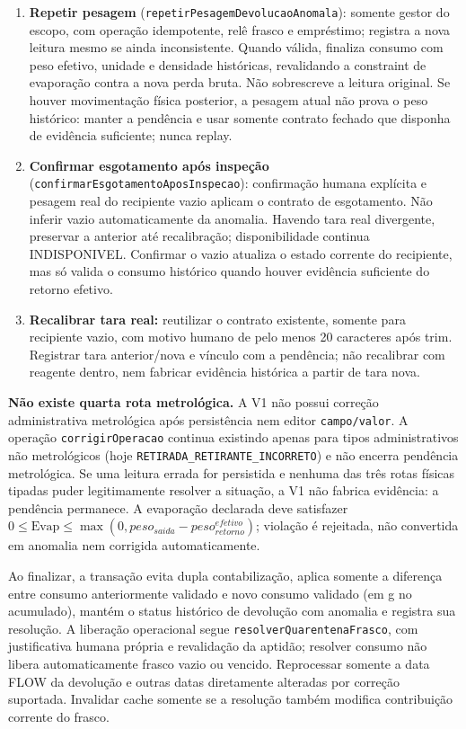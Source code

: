 \begin{enumerate}
\item \textbf{Repetir pesagem} (\nolinkurl{repetirPesagemDevolucaoAnomala}): somente gestor do escopo, com operação idempotente, relê frasco e empréstimo; registra a nova leitura mesmo se ainda inconsistente. Quando válida, finaliza consumo com peso efetivo, unidade e densidade históricas, revalidando a constraint de evaporação contra a nova perda bruta. Não sobrescreve a leitura original. Se houver movimentação física posterior, a pesagem atual não prova o peso histórico: manter a pendência e usar somente contrato fechado que disponha de evidência suficiente; nunca replay.
\item \textbf{Confirmar esgotamento após inspeção} (\nolinkurl{confirmarEsgotamentoAposInspecao}): confirmação humana explícita e pesagem real do recipiente vazio aplicam o contrato de esgotamento. Não inferir vazio automaticamente da anomalia. Havendo tara real divergente, preservar a anterior até recalibração; disponibilidade continua INDISPONIVEL. Confirmar o vazio atualiza o estado corrente do recipiente, mas só valida o consumo histórico quando houver evidência suficiente do retorno efetivo.
\item \textbf{Recalibrar tara real:} reutilizar o contrato existente, somente para recipiente vazio, com motivo humano de pelo menos 20 caracteres após trim. Registrar tara anterior/nova e vínculo com a pendência; não recalibrar com reagente dentro, nem fabricar evidência histórica a partir de tara nova.
\end{enumerate}
\textbf{Não existe quarta rota metrológica.} A V1 não possui correção administrativa metrológica após persistência nem editor \texttt{campo/valor}. A operação \nolinkurl{corrigirOperacao} continua existindo apenas para tipos administrativos não metrológicos (hoje \texttt{RETIRADA\_RETIRANTE\_INCORRETO}) e não encerra pendência metrológica. Se uma leitura errada for persistida e nenhuma das três rotas físicas tipadas puder legitimamente resolver a situação, a V1 não fabrica evidência: a pendência permanece. A evaporação declarada deve satisfazer $0 \le \text{Evap} \le \max(0, peso_{saida} - peso_{retorno}^{efetivo})$; violação é rejeitada, não convertida em anomalia nem corrigida automaticamente.

Ao finalizar, a transação evita dupla contabilização, aplica somente a diferença entre consumo anteriormente validado e novo consumo validado (em g no acumulado), mantém o status histórico de devolução com anomalia e registra sua resolução. A liberação operacional segue \nolinkurl{resolverQuarentenaFrasco}, com justificativa humana própria e revalidação da aptidão; resolver consumo não libera automaticamente frasco vazio ou vencido. Reprocessar somente a data FLOW da devolução e outras datas diretamente alteradas por correção suportada. Invalidar cache somente se a resolução também modifica contribuição corrente do frasco.

